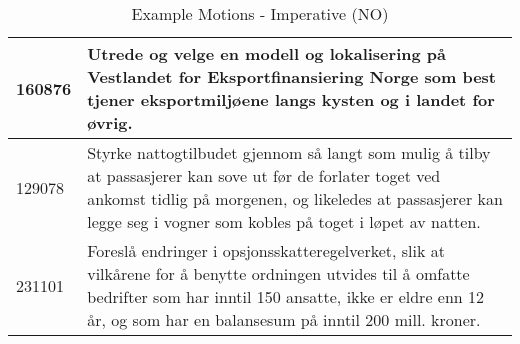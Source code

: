 {\begin{table}[H]
\begin{center}
\begin{tabularx}{\linewidth}{| l | X |}
\hline
160876 & Utrede og velge en modell og lokalisering på Vestlandet for Eksportfinansiering Norge som best tjener eksportmiljøene langs kysten og i landet for øvrig. \\
\hline
129078 & Styrke nattogtilbudet gjennom så langt som mulig å tilby at passasjerer kan sove ut før de forlater toget ved ankomst tidlig på morgenen, og likeledes at passasjerer kan legge seg i vogner som kobles på toget i løpet av natten. \\
\hline
231101 & Foreslå endringer i opsjonsskatteregelverket, slik at vilkårene for å benytte ordningen utvides til å omfatte bedrifter som har inntil 150 ansatte, ikke er eldre enn 12 år, og som har en balansesum på inntil 200 mill. kroner. \\
\hline
\end{tabularx}
\end{center}
\caption{Example Motions - Imperative (NO)}
\label{ImperativeNO}
\end{table}
}


